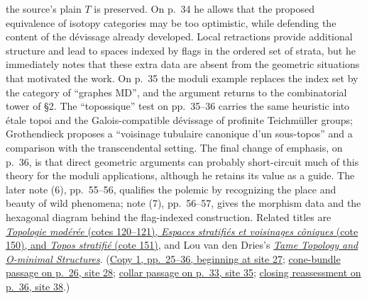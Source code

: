 the source's plain $T$ is preserved. On p.~34 he allows that the proposed
equivalence of isotopy categories may be too optimistic, while defending
the content of the dévissage already developed. Local retractions provide
additional structure and lead to spaces indexed by flags in the ordered
set of strata, but he immediately notes that these extra data are absent
from the geometric situations that motivated the work. On p.~35 the
moduli example replaces the index set by the category of ``graphes MD'',
and the argument returns to the combinatorial tower of \S2. The
``topossique'' test on pp.~35--36 carries the same heuristic into étale
topoi and the Galois-compatible dévissage of profinite Teichmüller groups;
Grothendieck proposes a ``voisinage tubulaire canonique d'un sous-topos''
and a comparison with the transcendental setting. The final change of
emphasis, on p.~36, is that direct geometric arguments can probably
short-circuit much of this theory for the moduli applications, although
he retains its value as a guide. The later note (6), pp.~55--56,
qualifies the polemic by recognizing the place and beauty of wild
phenomena; note (7), pp.~56--57, gives the morphism data and the hexagonal
diagram behind the flag-indexed construction. Related titles are
\href{https://grothendieck.umontpellier.fr/archives-grothendieck/}{\emph{Topologie modérée} (cotes 120--121), \emph{Espaces stratifiés et voisinages côniques} (cote 150), and \emph{Topos stratifié} (cote 151)},
and Lou van den Dries's
\href{https://assets.cambridge.org/97805215/98385/frontmatter/9780521598385_frontmatter.pdf}{\emph{Tame Topology and O-minimal Structures}}.
(\href{https://grothendieck.umontpellier.fr/web/viewer.html?file=../119.pdf\#page=28}{Copy 1, pp.~25--36, beginning at site 27};
\href{https://grothendieck.umontpellier.fr/web/viewer.html?file=../119.pdf\#page=29}{cone-bundle passage on p.~26, site 28};
\href{https://grothendieck.umontpellier.fr/web/viewer.html?file=../119.pdf\#page=36}{collar passage on p.~33, site 35};
\href{https://grothendieck.umontpellier.fr/web/viewer.html?file=../119.pdf\#page=39}{closing reassessment on p.~36, site 38}.)
